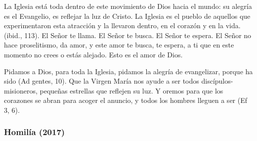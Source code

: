 \begin{body}
					La Iglesia está toda dentro de este movimiento de Dios hacia el mundo: su alegría es el Evangelio, es reflejar la luz de Cristo. La Iglesia es el pueblo de aquellos que experimentaron esta atracción y la llevaron dentro, en el corazón y en la vida.  (ibid., 113). El Señor te llama. El Señor te busca. El Señor te espera. El Señor no hace proselitismo, da amor, y este amor te busca, te espera, a ti que en este momento no crees o estás alejado. Esto es el amor de Dios.
					
					Pidamos a Dios, para toda la Iglesia, pidamos la alegría de evangelizar, porque ha sido  (Ad gentes, 10). Que la Virgen María nos ayude a ser todos discípulos-misioneros, pequeñas estrellas que reflejen su luz. Y oremos para que los corazones se abran para acoger el anuncio, y todos los hombres lleguen a ser  (Ef 3, 6).
				\end{body}
			
			\subsubsection{Homilía (2017)}
			
				
